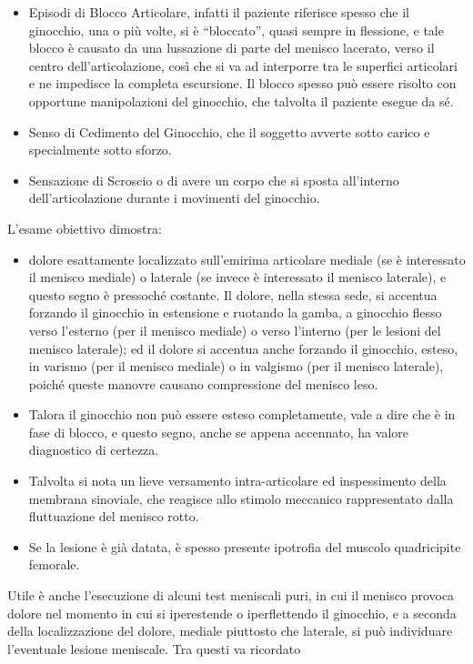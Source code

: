 \documentclass[]{article}
\begin{document}
\begin{itemize}
\item
  Episodi di Blocco Articolare, infatti il paziente riferisce spesso che
  il ginocchio, una o più volte, si è ``bloccato'', quasi sempre in
  flessione, e tale blocco è causato da una lussazione di parte del
  menisco lacerato, verso il centro dell'articolazione, così che si va
  ad interporre tra le superfici articolari e ne impedisce la completa
  escursione. Il blocco spesso può essere risolto con opportune
  manipolazioni del ginocchio, che talvolta il paziente esegue da sé.
\item
  Senso di Cedimento del Ginocchio, che il soggetto avverte sotto carico
  e specialmente sotto sforzo.
\item
  Sensazione di Scroscio o di avere un corpo che si sposta all'interno
  dell'articolazione durante i movimenti del ginocchio.
\end{itemize}

L'esame obiettivo dimostra:

\begin{itemize}
\item
  dolore esattamente localizzato sull'emirima articolare mediale (se è
  interessato il menisco mediale) o laterale (se invece è interessato il
  menisco laterale), e questo segno è pressoché costante. Il dolore,
  nella stessa sede, si accentua forzando il ginocchio in estensione e
  ruotando la gamba, a ginocchio flesso verso l'esterno (per il menisco
  mediale) o verso l'interno (per le lesioni del menisco laterale); ed
  il dolore si accentua anche forzando il ginocchio, esteso, in varismo
  (per il menisco mediale) o in valgismo (per il menisco laterale),
  poiché queste manovre causano compressione del menisco leso.
\item
  Talora il ginocchio non può essere esteso completamente, vale a dire
  che è in fase di blocco, e questo segno, anche se appena accennato, ha
  valore diagnostico di certezza.
\item
  Talvolta si nota un lieve versamento intra-articolare ed inspessimento
  della membrana sinoviale, che reagisce allo stimolo meccanico
  rappresentato dalla fluttuazione del menisco rotto.
\item
  Se la lesione è già datata, è spesso presente ipotrofia del muscolo
  quadricipite femorale.
\end{itemize}

Utile è anche l'esecuzione di alcuni test meniscali puri, in cui il
menisco provoca dolore nel momento in cui si iperestende o iperflettendo
il ginocchio, e a seconda della localizzazione del dolore, mediale
piuttosto che laterale, si può individuare l'eventuale lesione
meniscale. Tra questi va ricordato
\end{document}
